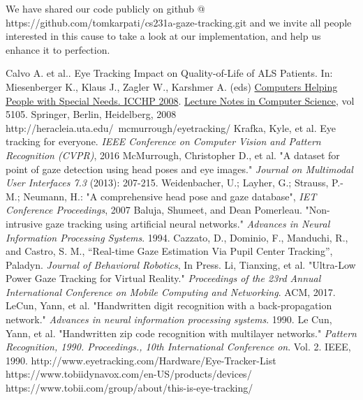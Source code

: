 \documentclass[10pt,twocolumn,letterpaper]{article}
\begin{document}
 

We have shared our code publicly on github @ https://github.com/tomkarpati/cs231a-gaze-tracking.git 
and we invite all people interested in this cause to take a look at our implementation, and help us enhance it to perfection.






{\small


\begin{thebibliography}{1}
  Calvo A. et al.. Eye Tracking Impact on Quality-of-Life of ALS
  Patients. In: Miesenberger K., Klaus J., Zagler W., Karshmer
  A. (eds) \underline{Computers Helping People with Special Needs. ICCHP
    2008}. \underline{Lecture Notes in Computer Science}, vol 5105. Springer,
  Berlin, Heidelberg, 2008
  http://heracleia.uta.edu/~mcmurrough/eyetracking/
  Krafka, Kyle, et al. Eye tracking for everyone.
  \textit{IEEE Conference on Computer Vision and Pattern Recognition
    (CVPR)}, 2016
  McMurrough, Christopher D., et al. "A dataset for point of gaze
  detection using head poses and eye images."
  \textit{Journal on Multimodal User Interfaces 7.3} (2013): 207-215.
  Weidenbacher, U.; Layher, G.; Strauss, P.-M.; Neumann, H.: "A
  comprehensive head pose and gaze database",
  \textit{IET Conference Proceedings}, 2007
  Baluja, Shumeet, and Dean Pomerleau. "Non-intrusive gaze tracking
  using artificial neural networks." \textit{Advances in Neural
    Information Processing Systems}. 1994.
  Cazzato, D., Dominio, F., Manduchi, R., and Castro, S. M.,
  “Real-time Gaze Estimation Via Pupil Center Tracking”,
  Paladyn. \textit{Journal of Behavioral Robotics}, In Press.
  Li, Tianxing, et al. "Ultra-Low Power Gaze Tracking for Virtual
  Reality." \textit{Proceedings of the 23rd Annual International
    Conference on Mobile Computing and Networking}. ACM, 2017.
  LeCun, Yann, et al. "Handwritten digit recognition with a
  back-propagation network." \textit{Advances in neural information
    processing systems}. 1990.
  Le Cun, Yann, et al. "Handwritten zip code recognition with
  multilayer networks." \textit{Pattern Recognition,
    1990. Proceedings., 10th International Conference
    on}. Vol. 2. IEEE, 1990.
  http://www.eyetracking.com/Hardware/Eye-Tracker-List
  https://www.tobiidynavox.com/en-US/products/devices/
  https://www.tobii.com/group/about/this-is-eye-tracking/

\end{thebibliography}
}
\end{document}
